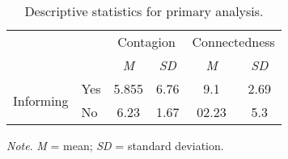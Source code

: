 \begin{table}[h!]
\centering
\begin{threeparttable}
\caption{Descriptive statistics for primary analysis.}
\label{tab:table1}
\begin{tabular}{l l c c c c} 
    \toprule
    & & \multicolumn{2}{c}{Contagion} & \multicolumn{2}{c}{Connectedness}  \\ \cmidrule{3-6}
    & & \textit{M} & \textit{SD} & \textit{M} & \textit{SD}   \\ \cmidrule{3-6}
    \multirow{ 2}{*}{Informing} & Yes & 5.855 & 6.76 & 9.1 & 2.69 \\ & No & 6.23 & 1.67 & 02.23 &5.3 \\
      \bottomrule
\end{tabular}
\begin{tablenotes}
\small
\textit{Note}. \textit{M} = mean; \textit{SD} = standard deviation.
\end{tablenotes}
\end{threeparttable}
\end{table}

